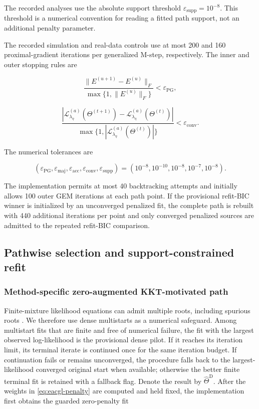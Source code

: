 \documentclass[preprint,12pt,authoryear]{elsarticle}
\begin{document}
The recorded analyses use the absolute support threshold
$\varepsilon_{\mathrm{supp}}=10^{-8}$. This threshold is a numerical convention
for reading a fitted path support, not an additional penalty parameter.

The recorded simulation and real-data controls use at most 200 and 160
proximal-gradient iterations per generalized M-step, respectively. The inner
and outer stopping rules are

\begin{equation}
\label{eq:pg-stopping}
\frac{\lVert E^{(u+1)}-E^{(u)}\rVert_F}
{\max\{1,\lVert E^{(u)}\rVert_F\}}
<\varepsilon_{\mathrm{PG}},
\end{equation}

\begin{equation}
\label{eq:gem-stopping}
\frac{|\mathcal L_{\lambda_\eta}^{(a)}(\Theta^{(t+1)})
-\mathcal L_{\lambda_\eta}^{(a)}(\Theta^{(t)})|}
{\max\{1,|\mathcal L_{\lambda_\eta}^{(a)}(\Theta^{(t)})|\}}
<\varepsilon_{\mathrm{conv}}.
\end{equation}

The numerical tolerances are

\[
(\varepsilon_{\mathrm{PG}},\varepsilon_{\mathrm{maj}},
\varepsilon_{\mathrm{acc}},\varepsilon_{\mathrm{conv}},
\varepsilon_{\mathrm{supp}})
=(10^{-8},10^{-10},10^{-8},10^{-7},10^{-8}).
\]

The implementation permits at most 40 backtracking attempts and initially
allows 100 outer GEM iterations at each path point. If the provisional
refit-BIC winner is initialized by an unconverged penalized fit, the complete
path is rebuilt with 440 additional iterations per point and only converged
penalized sources are admitted to the repeated refit-BIC comparison.

\subsection{Pathwise selection and support-constrained refit}

\subsubsection{Method-specific zero-augmented KKT-motivated path}

Finite-mixture likelihood equations can admit multiple roots, including
spurious roots \citep{seo2012root}. We therefore use dense multistarts as a
numerical safeguard.
Among multistart fits that are finite and free of numerical failure, the fit
with the largest observed log-likelihood is the provisional dense pilot. If it
reaches its iteration limit, its terminal
iterate is continued once for the same iteration budget. If continuation fails
or remains unconverged, the procedure falls back to the largest-likelihood
converged original start when available; otherwise the better finite terminal
fit is retained with a fallback flag. Denote the result by
$\widehat\Theta^{\mathrm D}$. After the weights in
\eqref{eq:eacgl-penalty} are computed and held fixed, the implementation first
obtains the guarded zero-penalty fit
\end{document}
